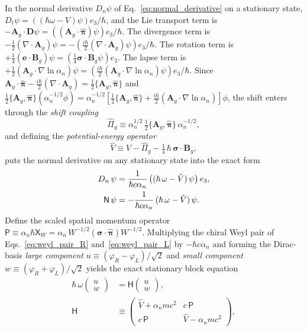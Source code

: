 \documentclass[aps,prd,onecolumn,tightenlines,nofootinbib,notitlepage,11pt,floatfix]{revtex4-2}
\theoremstyle{indentedtheorem}
\begin{document}
In the normal derivative $D_n\psi$ of Eq.~\eqref{eq:normal_derivative} on a stationary state, $D_t\psi = ((\hbar\omega-V)\psi)e_3/\hbar$, and the Lie transport term is $-\mathbf{A}_g\cdot\mathbf{D}\psi = ((\mathbf{A}_g\cdot\hat{\boldsymbol{\pi}})\psi)e_3/\hbar$. The divergence term is $-\tfrac{1}{2}(\nabla\cdot\mathbf{A}_g)\psi = -(\tfrac{i\hbar}{2}(\nabla\cdot\mathbf{A}_g)\psi)e_3/\hbar$. The rotation term is $+\tfrac{1}{4}(\mathbf{e}\cdot\mathbf{B}_g)\psi = (\tfrac{1}{4}\boldsymbol{\sigma}\cdot\mathbf{B}_g\psi)e_3$. The lapse term is $+\tfrac{1}{2}(\mathbf{A}_g\cdot\nabla\ln\alpha_n)\psi = (\tfrac{i\hbar}{2}(\mathbf{A}_g\cdot\nabla\ln\alpha_n)\psi)e_3/\hbar$. Since $\mathbf{A}_g\cdot\hat{\boldsymbol{\pi}} - \tfrac{i\hbar}{2}(\nabla\cdot\mathbf{A}_g) = \tfrac{1}{2}\{\mathbf{A}_g,\hat{\boldsymbol{\pi}}\}$ and $\tfrac{1}{2}\{\mathbf{A}_g,\hat{\boldsymbol{\pi}}\}(\alpha_n^{-1/2}\phi) = \alpha_n^{-1/2}[\tfrac{1}{2}\{\mathbf{A}_g,\hat{\boldsymbol{\pi}}\} + \tfrac{i\hbar}{2}(\mathbf{A}_g\cdot\nabla\ln\alpha_n)]\phi$, the shift enters through the \emph{shift coupling}
\begin{equation}
    \hat{\Pi}_g \equiv \alpha_n^{1/2}\,\tfrac{1}{2}\{\mathbf{A}_g,\hat{\boldsymbol{\pi}}\}\,\alpha_n^{-1/2} ,
    \label{eq:shift_coupling}
\end{equation}
and defining the \emph{potential-energy operator}
\begin{equation}
    \hat{V} \equiv V - \hat{\Pi}_g - \tfrac{1}{4}\,\hbar\,\boldsymbol{\sigma}\cdot\mathbf{B}_g ,
    \label{eq:potential_operator}
\end{equation}
puts the normal derivative on any stationary state into the exact form
\begin{align}
    D_n\,\psi &= \frac{1}{\hbar c\alpha_n}\,\big((\hbar\,\omega - \hat{V})\,\psi\big)\,e_3 , \notag\\
    \mathsf{N}\,\psi &= -\frac{1}{\hbar c\alpha_n}\,(\hbar\,\omega - \hat{V})\,\psi .
    \label{eq:left_connection_stationary}
\end{align}
Define the scaled spatial momentum operator $\mathsf{P} \equiv \alpha_n\hbar\mathsf{X}_W = \alpha_n\,W^{-1/2}(\boldsymbol{\sigma}\cdot\hat{\boldsymbol{\pi}})W^{-1/2}$. Multiplying the chiral Weyl pair of Eqs.~\eqref{eq:weyl_pair_R} and~\eqref{eq:weyl_pair_L} by $-\hbar c\alpha_n$ and forming the Dirac-basis \emph{large component} $u \equiv (\varphi_R-\varphi_L)/\sqrt{2}$ and \emph{small component} $w \equiv (\varphi_R+\varphi_L)/\sqrt{2}$ yields the exact stationary block equation
\begin{align}
    \hbar\,\omega \begin{pmatrix} u \\ w \end{pmatrix} &= \mathsf{H} \begin{pmatrix} u \\ w \end{pmatrix} ,
    \label{eq:block_equation} \\
    \mathsf{H} &\equiv \begin{pmatrix} \hat{V}+\alpha_nmc^2 & c\,\mathsf{P} \\ c\,\mathsf{P} & \hat{V}-\alpha_nmc^2 \end{pmatrix} , \nonumber
\end{align}
\end{document}
